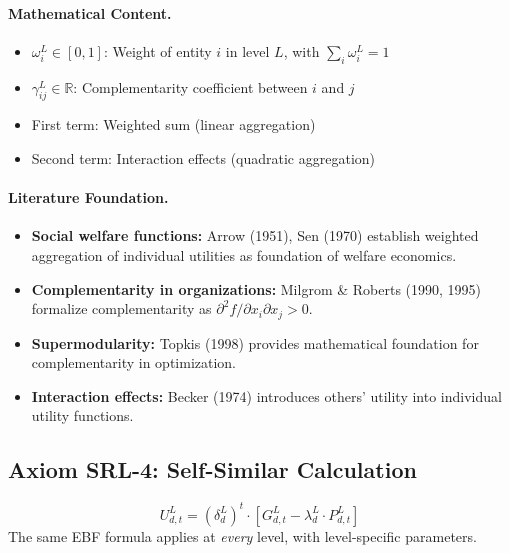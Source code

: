 \paragraph{Mathematical Content.}
\begin{itemize}
\item $\omega^L_i \in [0,1]$: Weight of entity $i$ in level $L$, with $\sum_i \omega^L_i = 1$
\item $\gamma^L_{ij} \in \mathbb{R}$: Complementarity coefficient between $i$ and $j$
\item First term: Weighted sum (linear aggregation)
\item Second term: Interaction effects (quadratic aggregation)
\end{itemize}

\paragraph{Literature Foundation.}
\begin{itemize}
\item \textbf{Social welfare functions:} Arrow (1951), Sen (1970) establish 
weighted aggregation of individual utilities as foundation of welfare economics.
\item \textbf{Complementarity in organizations:} Milgrom \& Roberts (1990, 1995) 
formalize complementarity as $\partial^2 f / \partial x_i \partial x_j > 0$.
\item \textbf{Supermodularity:} Topkis (1998) provides mathematical foundation 
for complementarity in optimization.
\item \textbf{Interaction effects:} Becker (1974) introduces others' utility 
into individual utility functions.
\end{itemize}

\subsection{Axiom SRL-4: Self-Similar Calculation}

\begin{tcolorbox}[colback=gray!5!white, colframe=gray!75!black, title=Axiom SRL-4: Self-Similarity]
\begin{equation}
\boxed{
U^L_{d,t} = (\delta^L_d)^t \cdot \left[ G^L_{d,t} - \lambda^L_d \cdot P^L_{d,t} \right]
}
\end{equation}
The same EBF formula applies at \emph{every} level, with level-specific parameters.
\end{tcolorbox}

